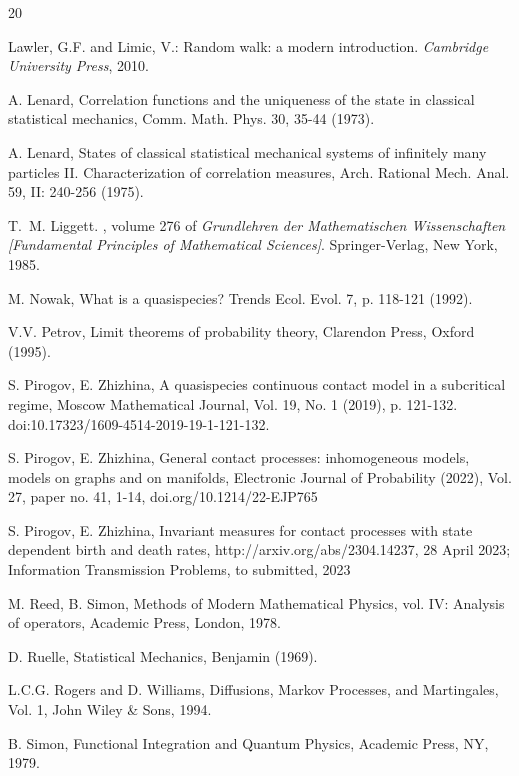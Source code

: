 \documentclass[a4paper,12pt]{article}
\begin{document}
\begin{thebibliography}{20}

   Lawler, G.F. and  Limic, V.: Random walk: a modern introduction. {\it Cambridge University Press}, 2010. %

 A. Lenard, Correlation functions and the uniqueness of the state in classical statistical mechanics,
Comm. Math. Phys. 30, 35-44 (1973).

 A. Lenard, States of classical statistical mechanical systems of infinitely many particles II. Characterization of correlation measures, Arch. Rational Mech. Anal.
59, II: 240-256 (1975).

T.~M. Liggett.
, volume 276 of {\em Grundlehren
  der Mathematischen Wissenschaften [Fundamental Principles of Mathematical
  Sciences]}.
\newblock Springer-Verlag, New York, 1985.




 M. Nowak, What is a quasispecies? Trends Ecol. Evol. 7, p. 118-121 (1992).

 V.V. Petrov, Limit theorems of probability theory, Clarendon Press, Oxford (1995).


 S. Pirogov, E. Zhizhina, A quasispecies continuous contact model in a subcritical regime, Moscow Mathematical Journal, Vol. 19, No. 1 (2019), p. 121-132. doi:10.17323/1609-4514-2019-19-1-121-132.


 S. Pirogov, E. Zhizhina, General contact processes: inhomogeneous models, models on graphs and on
manifolds, Electronic Journal of Probability (2022), Vol. 27, paper no. 41, 1-14, doi.org/10.1214/22-EJP765

  S. Pirogov, E. Zhizhina, Invariant measures for contact processes with state dependent birth and death rates, http://arxiv.org/abs/2304.14237, 28 April 2023; Information Transmission Problems, to submitted, 2023

 M. Reed, B. Simon, Methods of Modern Mathematical Physics, vol. IV: Analysis of operators, Academic Press, London, 1978.

 D. Ruelle, Statistical Mechanics, Benjamin (1969).

 L.C.G. Rogers and D. Williams, Diffusions, Markov Processes, and Martingales, Vol. 1, John Wiley \& Sons, 1994.

 B. Simon, Functional Integration and Quantum Physics, Academic Press, NY, 1979.


\end{thebibliography}
\end{document}
